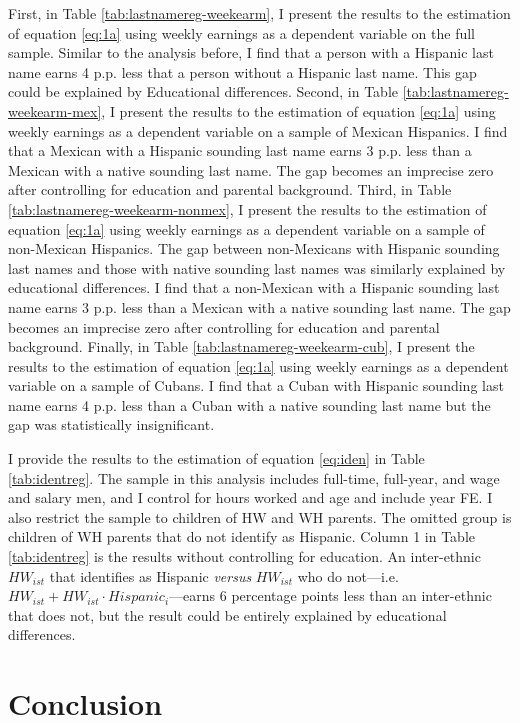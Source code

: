 First, in Table \ref{tab:lastnamereg-weekearm}, I present the results to the estimation of equation \ref{eq:1a} using weekly earnings as a dependent variable on the full sample. Similar to the analysis before, I find that a person with a Hispanic last name earns 4 p.p. less that a person without a Hispanic last name. This gap could be explained by Educational differences. Second, in Table \ref{tab:lastnamereg-weekearm-mex}, I present the results to the estimation of equation \ref{eq:1a} using weekly earnings as a dependent variable on a sample of Mexican Hispanics. I find that a Mexican with a Hispanic sounding last name earns 3 p.p. less than a Mexican with a native sounding last name. The gap becomes an imprecise zero after controlling for education and parental background. Third, in Table \ref{tab:lastnamereg-weekearm-nonmex}, I present the results to the estimation of equation \ref{eq:1a} using weekly earnings as a dependent variable on a sample of non-Mexican Hispanics. The gap between non-Mexicans with Hispanic sounding last names and those with native sounding last names was similarly explained by educational differences. I find that a non-Mexican with a Hispanic sounding last name earns 3 p.p. less than a Mexican with a native sounding last name. The gap becomes an imprecise zero after controlling for education and parental background. Finally, in Table \ref{tab:lastnamereg-weekearm-cub}, I present the results to the estimation of equation \ref{eq:1a} using weekly earnings as a dependent variable on a sample of Cubans. I find that a Cuban with Hispanic sounding last name earns 4 p.p. less than a Cuban with a native sounding last name but the gap was statistically insignificant.

I provide the results to the estimation of equation \ref{eq:iden} in Table \ref{tab:identreg}. The sample in this analysis includes full-time, full-year, and wage and salary men, and I control for hours worked and age and include year FE. I also restrict the sample to children of HW and WH parents. The omitted group is children of WH parents that do not identify as Hispanic. Column 1 in Table \ref{tab:identreg} is the results without controlling for education. An inter-ethnic $HW_{ist}$ that identifies as Hispanic \textit{versus} $HW_{ist}$ who do not---i.e. $HW_{ist} + HW_{ist} \cdot Hispanic_i$---earns 6 percentage points less than an inter-ethnic that does not, but the result could be entirely explained by educational differences.

\section{Conclusion}\label{sec:con1}

